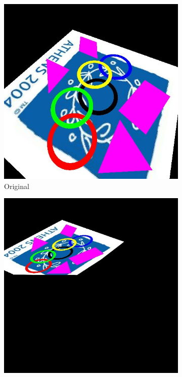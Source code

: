\documentclass[paper=a4, fontsize=11pt]{scrartcl} %
\begin{document}
\begin{figure}
    \centering
    \begin{subfigure}[ht]{0.3\textwidth}
        \centering
        \includegraphics[width=\textwidth]{figures/img11.jpg}
        \caption{Original\label{fig:img11_tile}}    
    \end{subfigure}
    \hfill
    \begin{subfigure}[ht]{0.3\textwidth}  
        \centering 
        \includegraphics[width=\textwidth]{figures/img11_aff.jpg}

\end{subfigure}
\end{figure}
\end{document}
